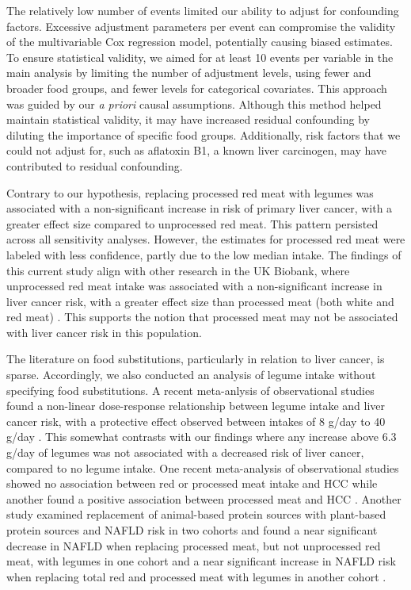 \documentclass[nutrients,article,submit,moreauthors,pdftex]{Definitions/mdpi}
\begin{document}
The relatively low number of events limited our ability to adjust for
confounding factors. Excessive adjustment parameters per event can
compromise the validity of the multivariable Cox regression model,
potentially causing biased estimates. To ensure statistical validity, we
aimed for at least 10 events per variable in the main analysis by
limiting the number of adjustment levels, using fewer and broader food
groups, and fewer levels for categorical covariates. This approach was
guided by our \emph{a priori} causal assumptions. Although this method
helped maintain statistical validity, it may have increased residual
confounding by diluting the importance of specific food groups.
Additionally, risk factors that we could not adjust for, such as
aflatoxin B1, a known liver carcinogen, may have contributed to residual
confounding.

Contrary to our hypothesis, replacing processed red meat with legumes
was associated with a non-significant increase in risk of primary liver
cancer, with a greater effect size compared to unprocessed red meat.
This pattern persisted across all sensitivity analyses. However, the
estimates for processed red meat were labeled with less confidence,
partly due to the low median intake. The findings of this current study
align with other research in the UK Biobank, where unprocessed red meat
intake was associated with a non-significant increase in liver cancer
risk, with a greater effect size than processed meat (both white and red
meat) \citep{Knuppel2020}. This supports the notion that processed meat
may not be associated with liver cancer risk in this population.

The literature on food substitutions, particularly in relation to liver
cancer, is sparse. Accordingly, we also conducted an analysis of legume
intake without specifying food substitutions. A recent meta-anlysis of
observational studies found a non-linear dose-response relationship
between legume intake and liver cancer risk, with a protective effect
observed between intakes of 8 g/day to 40 g/day \citep{liu2023a}. This
somewhat contrasts with our findings where any increase above 6.3 g/day
of legumes was not associated with a decreased risk of liver cancer,
compared to no legume intake. One recent meta-analysis of observational
studies showed no association between red or processed meat intake and
HCC \citep{Di2023} while another found a positive association between
processed meat and HCC \citep{Yu2022}. Another study examined
replacement of animal-based protein sources with plant-based protein
sources and NAFLD risk in two cohorts and found a near significant
decrease in NAFLD when replacing processed meat, but not unprocessed red
meat, with legumes in one cohort and a near significant increase in
NAFLD risk when replacing total red and processed meat with legumes in
another cohort \citep{Zhang2023}.
\end{document}
